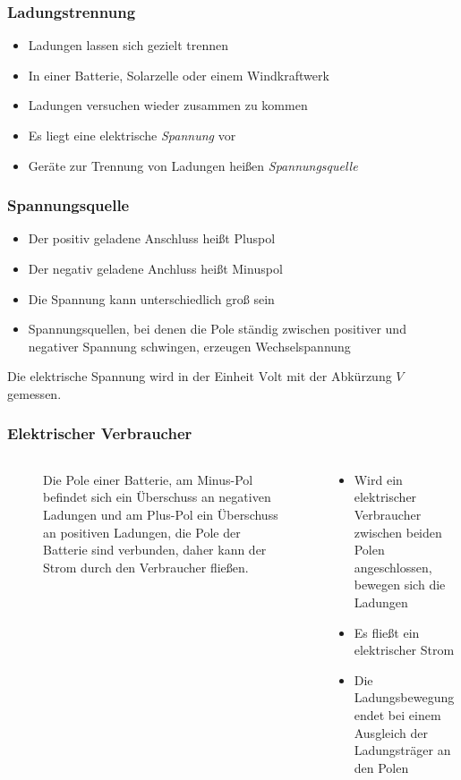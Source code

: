 \begin{frame}
\frametitle{Ladungstrennung}
\begin{itemize}
  \item Ladungen lassen sich gezielt trennen
  \item In einer Batterie, Solarzelle oder einem Windkraftwerk
  \item Ladungen versuchen wieder zusammen zu kommen
  \item Es liegt eine elektrische \emph{Spannung} vor
  \item Geräte zur Trennung von Ladungen heißen \emph{Spannungsquelle}
  \end{itemize}
\end{frame}

\begin{frame}
\frametitle{Spannungsquelle}
\begin{itemize}
  \item Der positiv geladene Anschluss heißt Pluspol
  \item Der negativ geladene Anchluss heißt Minuspol
  \item Die Spannung kann unterschiedlich groß sein
  \item Spannungsquellen, bei denen die Pole ständig zwischen positiver und negativer Spannung schwingen, erzeugen Wechselspannung
  \end{itemize}
    \pause
    Die elektrische Spannung wird in der Einheit $\text{Volt}$ mit der Abkürzung $V$ gemessen.



\end{frame}

\begin{frame}
\frametitle{Elektrischer Verbraucher}
\begin{columns}
    \begin{column}{0.48\textwidth}
    
\begin{figure}
    \caption{\scriptsize Die Pole einer Batterie, am Minus-Pol befindet sich ein Überschuss an negativen Ladungen und am Plus-Pol ein Überschuss an positiven Ladungen, die Pole der Batterie sind verbunden, daher kann der Strom durch den Verbraucher fließen.}
    \label{n_frequenz_strom_fliesst}
\end{figure}


    \end{column}
   \begin{column}{0.48\textwidth}
       \begin{itemize}
  \item Wird ein elektrischer Verbraucher zwischen beiden Polen angeschlossen, bewegen sich die Ladungen
  \item Es fließt ein elektrischer Strom
  \item Die Ladungsbewegung endet bei einem Ausgleich der Ladungsträger an den Polen
  \end{itemize}

   \end{column}
\end{columns}

\end{frame}%
